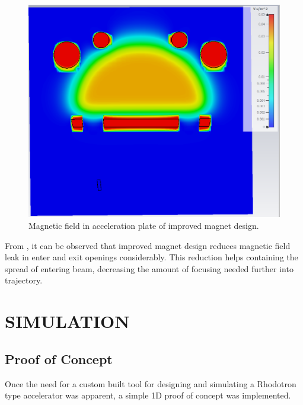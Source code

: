 \documentclass[a4paper,oneside,12pt]{report}
\numberwithin{equation}{chapter}
\begin{document}
\begin{figure}[H]
    \centering
    \captionsetup{justification=centering}
    \includegraphics[width=.8\linewidth]{./figures/cst/cst_second_magnet_design4.png}
    \caption{Magnetic field in acceleration plate of improved magnet design.}
    \label{fig:improved_magnet_design_B}
\end{figure}


From , it can be observed that improved magnet design reduces magnetic field leak in enter and exit openings considerably. 
This reduction helps containing the spread of entering beam, decreasing the amount of focusing needed further into trajectory. 




\newpage


\chapter{SIMULATION}
\section{Proof of Concept}
Once the need for a custom built tool for designing and simulating a Rhodotron type accelerator was apparent, a simple 1D proof of concept was implemented.
\end{document}
